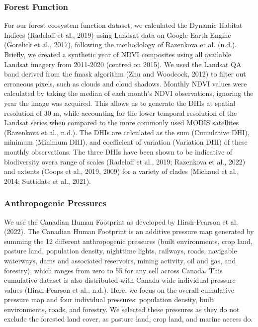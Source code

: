 \documentclass[
]{agujournal2019}
\begin{document}
\subsubsection{Forest Function}\label{forest-function}

For our forest ecosystem function dataset, we calculated the Dynamic
Habitat Indices (Radeloff et al., 2019) using Landsat data on Google
Earth Engine (Gorelick et al., 2017), following the methodology of
Razenkova et al. (n.d.). Briefly, we created a synthetic year of NDVI
composites using all available Landsat imagery from 2011-2020 (centred
on 2015). We used the Landsat QA band derived from the fmask algorithm
(Zhu and Woodcock, 2012) to filter out erroneous pixels, such as clouds
and cloud shadows. Monthly NDVI values were calculated by taking the
median of each month's NDVI observations, ignoring the year the image
was acquired. This allows us to generate the DHIs at spatial resolution
of 30 m, while accounting for the lower temporal resolution of the
Landsat series when compared to the more commonly used MODIS satellites
(Razenkova et al., n.d.). The DHIs are calculated as the sum (Cumulative
DHI), minimum (Minimum DHI), and coefficient of variation (Variation
DHI) of these monthly observations. The three DHIs have been shown to be
indicative of biodiversity overa range of scales (Radeloff et al., 2019;
Razenkova et al., 2022) and extents (Coops et al., 2019, 2009) for a
variety of clades (Michaud et al., 2014; Suttidate et al., 2021).

\subsubsection{Anthropogenic Pressures}\label{anthropogenic-pressures}

We use the Canadian Human Footprint as developed by Hirsh-Pearson et al.
(2022). The Canadian Human Footprint is an additive pressure map
generated by summing the 12 different anthropogenic pressures (built
environments, crop land, pasture land, population density, nighttime
lights, railways, roads, navigable waterways, dams and associated
reservoirs, mining activity, oil and gas, and forestry), which ranges
from zero to 55 for any cell across Canada. This cumulative dataset is
also distributed with Canada-wide individual pressure values
(Hirsh-Pearson et al., n.d.). Here, we focus on the overall cumulative
pressure map and four individual pressures: population density, built
environments, roads, and forestry. We selected these pressures as they
do not exclude the forested land cover, as pasture land, crop land, and
marine access do.
\end{document}
